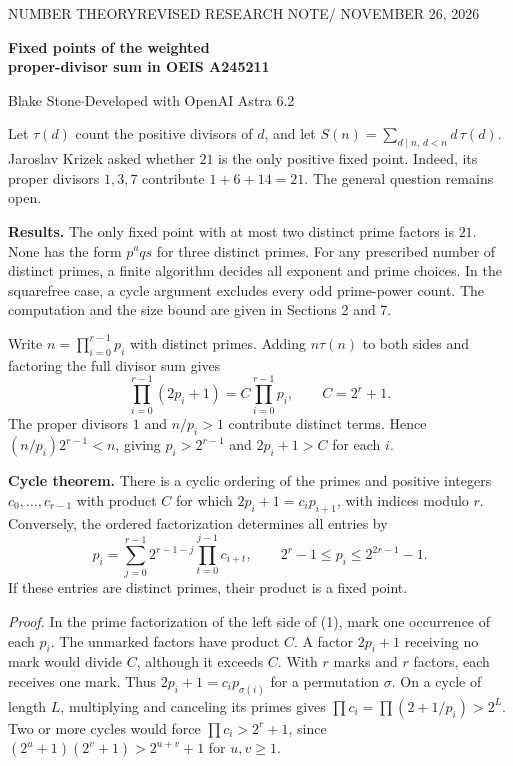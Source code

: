 \documentclass[12pt,letterpaper]{article}
\newcommand{\hd}[1]{\par\vspace{3pt}{\large\sffamily\bfseries\color{teal} #1}\par}
\newcommand{\thm}[1]{\textbf{\color{ink}#1.}\enspace}
\begin{document}
\thispagestyle{empty}
{\small\sffamily\color{teal} NUMBER THEORY\hfill REVISED RESEARCH NOTE\enspace / \enspace NOVEMBER 26, 2026}\par\vspace{4pt}
{\fontsize{24}{27}\selectfont\sffamily\bfseries\color{ink} Fixed points of the weighted\\proper-divisor sum in OEIS A245211}\par
{\small\sffamily Blake Stone\quad$\cdot$\quad Developed with OpenAI Astra 6.2}\par
Let $\tau(d)$ count the positive divisors of $d$, and let $S(n)=\sum_{d\mid n,\,d<n}d\,\tau(d)$. Jaroslav Krizek asked whether $21$ is the only positive fixed point. Indeed, its proper divisors $1,3,7$ contribute $1+6+14=21$. The general question remains open.

\thm{Results} The only fixed point with at most two distinct prime factors is $21$. None has the form $p^a q s$ for three distinct primes. For any prescribed number of distinct primes, a finite algorithm decides all exponent and prime choices. In the squarefree case, a cycle argument excludes every odd prime-power count. The computation and the size bound are given in Sections 2 and 7.

\hd{1\quad The squarefree cycle}
Write $n=\prod_{i=0}^{r-1}p_i$ with distinct primes. Adding $n\tau(n)$ to both sides and factoring the full divisor sum gives
\begin{equation}
\prod_{i=0}^{r-1}(2p_i+1)=C\prod_{i=0}^{r-1}p_i,\qquad C=2^r+1. \tag{1}
\end{equation}
The proper divisors $1$ and $n/p_i>1$ contribute distinct terms. Hence $(n/p_i)2^{r-1}<n$, giving $p_i>2^{r-1}$ and $2p_i+1>C$ for each $i$.

\thm{Cycle theorem} There is a cyclic ordering of the primes and positive integers $c_0,\ldots,c_{r-1}$ with product $C$ for which $2p_i+1=c_i p_{i+1}$, with indices modulo $r$. Conversely, the ordered factorization determines all entries by
\begin{equation}
p_i=\sum_{j=0}^{r-1}2^{r-1-j}\prod_{t=0}^{j-1}c_{i+t},\qquad 2^r-1\le p_i\le 2^{2r-1}-1. \tag{2}
\end{equation}
If these entries are distinct primes, their product is a fixed point.

\emph{Proof.} In the prime factorization of the left side of (1), mark one occurrence of each $p_i$. The unmarked factors have product $C$. A factor $2p_i+1$ receiving no mark would divide $C$, although it exceeds $C$. With $r$ marks and $r$ factors, each receives one mark. Thus $2p_i+1=c_i p_{\sigma(i)}$ for a permutation $\sigma$. On a cycle of length $L$, multiplying and canceling its primes gives $\prod c_i=\prod(2+1/p_i)>2^L$. Two or more cycles would force $\prod c_i>2^r+1$, since $(2^u+1)(2^v+1)>2^{u+v}+1$ for $u,v\ge1$.
\end{document}
